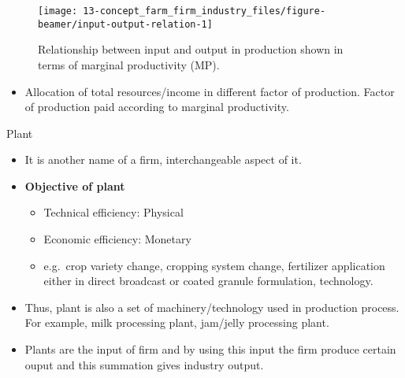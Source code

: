 \documentclass[12pt,ignorenonframetext,aspectratio=169]{beamer}
\providecommand{\tightlist}{%
  \setlength{\itemsep}{0pt}\setlength{\parskip}{0pt}}
\begin{document}
\begin{frame}{}
\protect\hypertarget{section-2}{}
\begin{figure}
\texttt{[image: 13-concept\_farm\_firm\_industry\_files/figure-beamer/input-output-relation-1]} \caption{Relationship between input and output in production shown in terms of marginal productivity (MP).}\label{fig:input-output-relation}
\end{figure}

\begin{itemize}
\tightlist
\item
  Allocation of total resources/income in different factor of
  production. Factor of production paid according to marginal
  productivity.
\end{itemize}
\end{frame}

\begin{frame}{Plant}
\protect\hypertarget{plant}{}
\begin{itemize}
\tightlist
\item
  It is another name of a firm, interchangeable aspect of it.
\item
  \textbf{Objective of plant}

  \begin{itemize}
  \tightlist
  \item
    Technical efficiency: Physical
  \item
    Economic efficiency: Monetary
  \item
    e.g.~crop variety change, cropping system change, fertilizer
    application either in direct broadcast or coated granule
    formulation, technology.
  \end{itemize}
\item
  Thus, plant is also a set of machinery/technology used in production
  process. For example, milk processing plant, jam/jelly processing
  plant.
\item
  Plants are the input of firm and by using this input the firm produce
  certain ouput and this summation gives industry output.
\end{itemize}
\end{frame}
\end{document}
